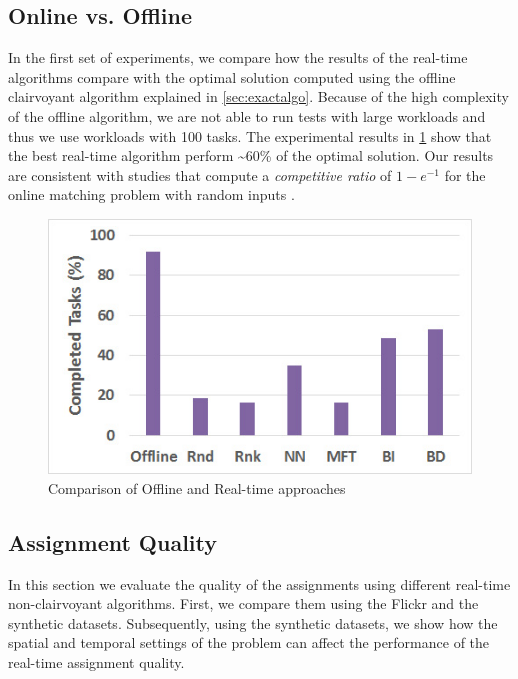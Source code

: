 \subsection{Online vs. Offline}
\vspace{0.1in}
In the first set of experiments, we compare how the results of the real-time algorithms compare with the optimal solution computed using the offline clairvoyant algorithm explained in \cref{sec:exactalgo}. Because of the high complexity of the offline algorithm, we are not able to run tests with large workloads and thus we use workloads with 100 tasks. The experimental results in \cref{fig:off_vs_on} show that the best real-time algorithm perform \textasciitilde 60\% of the optimal solution. Our results are consistent with studies that compute a \emph{competitive ratio} \cite{Sleator85} of $1 - e^{-1}$ for the online matching problem with random inputs \cite{Goel08}.

\begin{figure}[h]
	\centering
	\includegraphics[width = 0.6\columnwidth]{figures/off_vs_on.jpg}
	\caption{Comparison of Offline and Real-time approaches}\label{fig:off_vs_on}
\end{figure}

\vspace{0.2in}
\subsection{Assignment Quality}
In this section we evaluate the quality of the assignments using different real-time non-clairvoyant algorithms. First, we compare them using the Flickr and the synthetic datasets. Subsequently, using the synthetic datasets, we show how the spatial and temporal settings of the problem can affect the performance of the real-time assignment quality.

